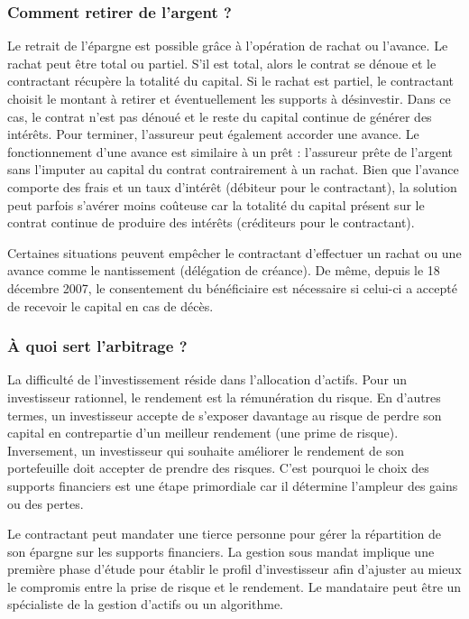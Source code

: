 \documentclass{article}
\newcommand{\blackFrame}[2]{
    \begin{tcolorbox}[colback=white,colframe=black!100!white,title={#1}]
        #2
    \end{tcolorbox}
}
\begin{document}
\subsubsection{Comment retirer de l'argent ?}
Le retrait de l'épargne est possible grâce à l'opération de rachat ou l'avance. Le rachat peut être total ou partiel. S'il est total, alors le contrat se dénoue et le contractant récupère la totalité du capital. Si le rachat est partiel, le contractant choisit le montant à retirer et éventuellement les supports à désinvestir. Dans ce cas, le contrat n'est pas dénoué et le reste du capital continue de générer des intérêts. Pour terminer, l'assureur peut également accorder une avance. Le fonctionnement d'une avance est similaire à un prêt : l'assureur prête de l'argent sans l'imputer au capital du contrat contrairement à un rachat. Bien que l'avance comporte des frais et un taux d'intérêt (débiteur pour le contractant), la solution peut parfois s'avérer moins coûteuse car la totalité du capital présent sur le contrat continue de produire des intérêts (créditeurs pour le contractant).

\blackFrame{Cas particuliers}{
    Certaines situations peuvent empêcher le contractant d'effectuer un rachat ou une avance comme le nantissement (délégation de créance). De même, depuis le 18 décembre 2007, le consentement du bénéficiaire est nécessaire si celui-ci a accepté de recevoir le capital en cas de décès.
}

\subsubsection{À quoi sert l'arbitrage ?}
La difficulté de l'investissement réside dans l'allocation d'actifs. Pour un investisseur rationnel, le rendement est la rémunération du risque. En d'autres termes, un investisseur accepte de s'exposer davantage au risque de perdre son capital en contrepartie d'un meilleur rendement (une prime de risque). Inversement, un investisseur qui souhaite améliorer le rendement de son portefeuille doit accepter de prendre des risques. C'est pourquoi le choix des supports financiers est une étape primordiale car il détermine l'ampleur des gains ou des pertes.

\blackFrame{Mandat de gestion}{
Le contractant peut mandater une tierce personne pour gérer la répartition de son épargne sur les supports financiers. La gestion sous mandat implique une première phase d'étude pour établir le profil d'investisseur afin d'ajuster au mieux le compromis entre la prise de risque et le rendement. Le mandataire peut être un spécialiste de la gestion d'actifs ou un algorithme.
}
\end{document}
